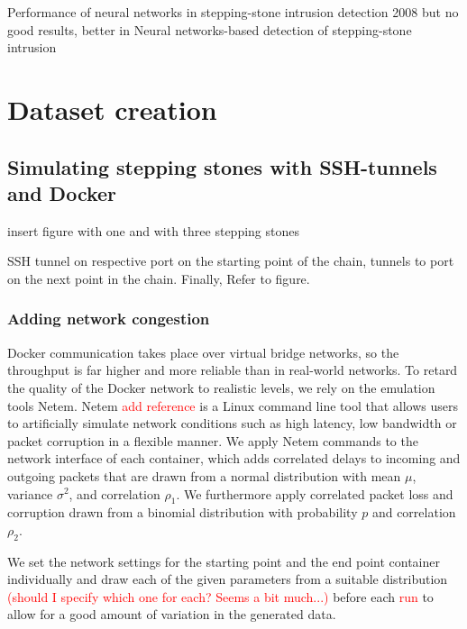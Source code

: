 \documentclass[conference]{IEEEtran}\usepackage[]{graphicx}\usepackage[]{color}
\begin{document}
Performance of neural networks in stepping-stone intrusion detection 2008
but no good results, better in Neural  networks-based  detection  of stepping-stone  intrusion


\section{Dataset creation}

\subsection{Simulating stepping stones with SSH-tunnels and Docker}

insert figure with one and with three stepping stones



SSH tunnel on respective port on the starting point of the chain, tunnels to port on the next point in the chain. Finally, Refer to figure. 

\subsubsection{Adding network congestion}

Docker communication takes place over virtual bridge networks, so the throughput is far higher and more reliable than in real-world networks. %
To retard the quality of the Docker network to realistic levels, we rely on the emulation tools Netem. Netem \textcolor{red}{add reference} is a Linux command line tool that allows users to artificially simulate network conditions such as high latency, low bandwidth or packet corruption in a flexible manner.
We apply Netem commands to the network interface of each container, which adds correlated delays to incoming and outgoing packets that are drawn from a normal distribution with mean $\mu$, variance $\sigma^2$, and correlation $\rho_1$. We furthermore apply correlated packet loss and corruption drawn from a binomial distribution with probability $p$ and correlation $\rho_2$.

We set the network settings for the starting point and the end point container individually and draw each of the given parameters from a suitable distribution \textcolor{red}{(should I specify which one for each? Seems a bit much...)} before each \textcolor{red}{run} to allow for a good amount of variation in the generated data.
\end{document}
